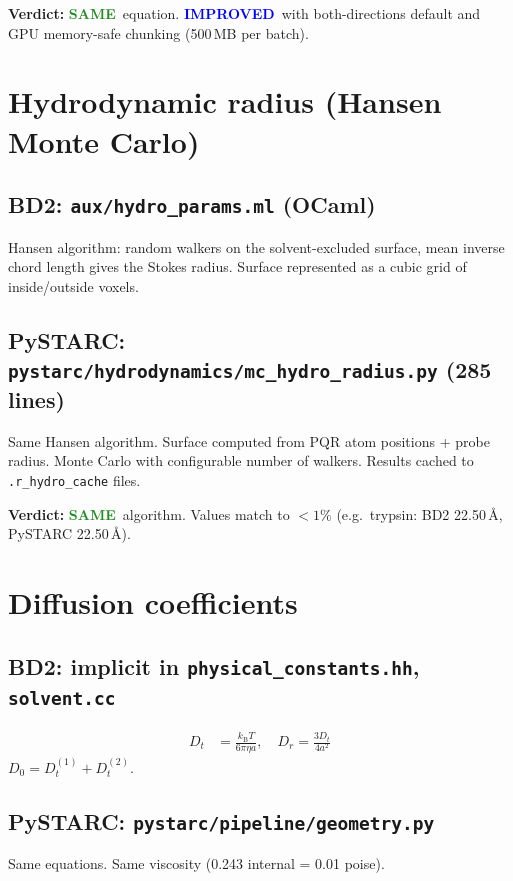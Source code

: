 \documentclass[11pt]{article}
\newcommand{\kBT}{k_{\mathrm{B}}T}
\newcommand{\same}{\textcolor{ForestGreen}{\textbf{SAME}}}
\newcommand{\improved}{\textcolor{Blue}{\textbf{IMPROVED}}}
\begin{document}
\textbf{Verdict:} \same\ equation. \improved\ with both-directions default
and GPU memory-safe chunking (500\,MB per batch).


\section{Hydrodynamic radius (Hansen Monte Carlo)}

\subsection{BD2: \texttt{aux/hydro\_params.ml} (OCaml)}
Hansen algorithm: random walkers on the solvent-excluded surface,
mean inverse chord length gives the Stokes radius.
Surface represented as a cubic grid of inside/outside voxels.

\subsection{PySTARC: \texttt{pystarc/hydrodynamics/mc\_hydro\_radius.py} (285 lines)}
Same Hansen algorithm. Surface computed from PQR atom positions + probe radius.
Monte Carlo with configurable number of walkers.
Results cached to \texttt{.r\_hydro\_cache} files.

\textbf{Verdict:} \same\ algorithm. Values match to $<1\%$
(e.g.\ trypsin: BD2 22.50\,\AA, PySTARC 22.50\,\AA).


\section{Diffusion coefficients}

\subsection{BD2: implicit in \texttt{physical\_constants.hh}, \texttt{solvent.cc}}
\begin{align}
D_t &= \frac{\kBT}{6\pi\eta a}, \quad D_r = \frac{3D_t}{4a^2}
\end{align}
$D_0 = D_t^{(1)} + D_t^{(2)}$.

\subsection{PySTARC: \texttt{pystarc/pipeline/geometry.py}}
Same equations. Same viscosity (0.243 internal = 0.01 poise).
\end{document}
